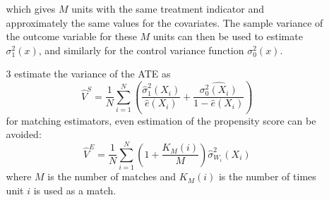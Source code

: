 \documentclass[twoside]{article}
\begin{document}
\begin{itemize}
\begin{itemize}
$$        $$
        which gives $M$ units with the same treatment indicator and approximately the same values for the covariates. The sample variance of the outcome variable for these $M$ units can then be used to estimate $\sigma^2_1(x)$, and similarly for the control variance function $\sigma^2_0(x)$. 
        \item[3] estimate the variance of the ATE as
        \begin{equation*}
            \hat{V}^S = \frac{1}{N} \sum^N_{i=1}\left( \frac{\hat{\sigma}^2_1(X_i)}{\hat{e}(X_i)} + \frac{\hat{\sigma^2_{0}(X_i)}}{1-\hat{e}(X_i)} \right)
        \end{equation*}
        for matching estimators, even estimation of the propensity score can be avoided:
        \begin{equation*}
            \hat{V}^E = \frac{1}{N}\sum^N_{i=1} \left(1+\frac{K_M(i)}{M}\right)\hat{\sigma}^2_{W_i}(X_i)
        \end{equation*}
        where $M$ is the number of matches and $K_M(i)$ is the number of times unit $i$ is used as a match.
    \end{itemize}
\end{itemize}
\end{document}
